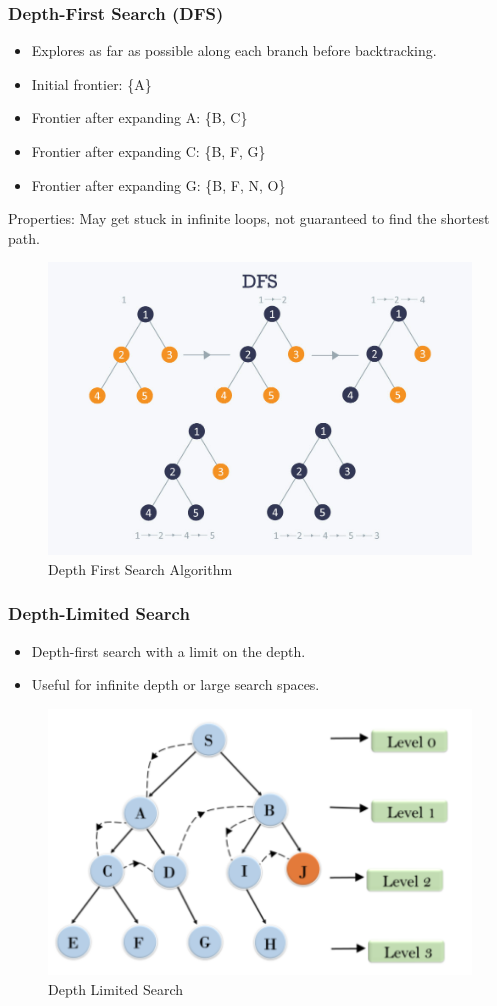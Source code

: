 \documentclass[8pt]{article}
\begin{document}
\subsubsection{Depth-First Search (DFS)}
\begin{itemize}
    \item Explores as far as possible along each branch before backtracking.
    \item Initial frontier: \{A\}
    \item Frontier after expanding A: \{B, C\}
    \item Frontier after expanding C: \{B, F, G\}
    \item Frontier after expanding G: \{B, F, N, O\}
\end{itemize}
Properties: May get stuck in infinite loops, not guaranteed to find the shortest path.

\begin{figure}[!h]
    \centering
    \includegraphics[width=0.5\linewidth]{images/DFS.jpg}
    \caption{Depth First Search Algorithm}
    \label{fig:enter-label}
\end{figure}

\newpage
\subsubsection{Depth-Limited Search}
\begin{itemize}
    \item Depth-first search with a limit on the depth.
    \item Useful for infinite depth or large search spaces.
\end{itemize}

\begin{figure}[!h]
    \centering
    \includegraphics[width=0.5\linewidth]{images/dls.PNG}
    \caption{Depth Limited Search}
    \label{fig:enter-label}
\end{figure}
\end{document}
